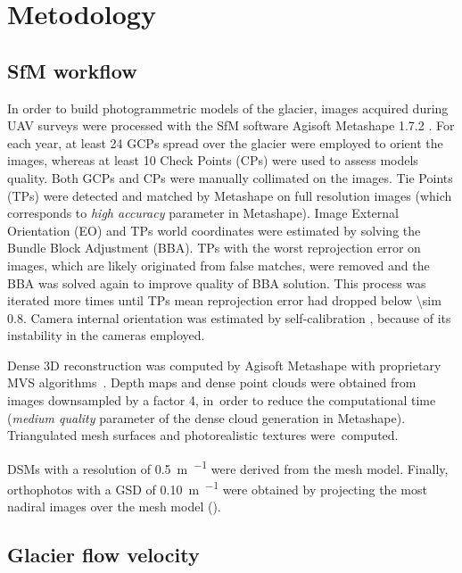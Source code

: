 \section{Metodology}\label{sec:3:methodology}

\subsection{SfM workflow}\label{sec:3:sfm}

In order to build photogrammetric models of the glacier, images acquired during UAV
surveys were processed with the SfM software Agisoft Metashape 1.7.2 \citep{agisoft}.
For each year, at least 24 GCPs spread over the glacier were employed to orient the
images, whereas at least 10 Check Points (CPs) were used to assess models quality.
Both GCPs and CPs were manually collimated on the images.
Tie Points (TPs) were detected and matched by Metashape on full resolution images (which
corresponds to \textit{high accuracy} parameter in Metashape).
Image External Orientation (EO) and TPs world coordinates were estimated by solving the
Bundle Block Adjustment (BBA).
TPs with the worst reprojection error on images, which are likely originated from false
matches, were removed and the BBA was solved again to improve quality of BBA solution.
This process was iterated more times until TPs mean reprojection error had dropped below
\SI{\sim 0.8}{\pixel}.
Camera internal orientation was estimated by self-calibration
\citep{Fraser2013,Cramer2017}, because of its instability in the cameras employed.

Dense 3D reconstruction was computed by Agisoft Metashape with proprietary MVS
algorithms~\citep{Dallasta}.
Depth maps and dense point clouds were obtained from images downsampled by a factor 4,
in~order to reduce the computational time (\textit{medium quality} parameter of the dense
cloud generation in Metashape).
Triangulated mesh surfaces and photorealistic textures were~computed.

DSMs with a resolution of \SI{0.5}{\meter\per\pixel} were derived from the mesh model.
Finally, orthophotos with a GSD of \SI{0.10}{\meter\per\pixel} were obtained by
projecting the most nadiral images over the mesh model ().

\subsection{Glacier flow velocity}\label{sec:3:method_velocity}

